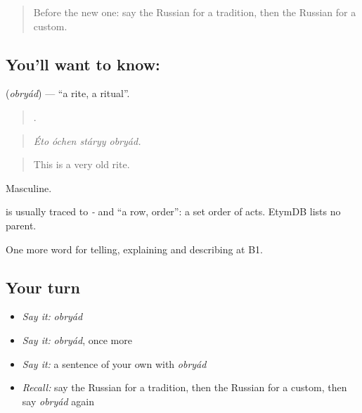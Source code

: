 \label{lesson:RU-C318-obryad}



\begin{quote}
Before the new one: say the Russian for a tradition, then the Russian for a custom.
\end{quote}

\subsection*{You'll want to know: }
\textbf{} (\emph{obryád}) — \textquotedblleft{}a rite, a ritual\textquotedblright{}.

\begin{quote}
   .
\end{quote}

\begin{quote}
\emph{Éto óchen stáryy obryád.}
\end{quote}

\begin{quote}
This is a very old rite.
\end{quote}

Masculine.

\begin{cousinweb}
\emph{} is usually traced to \emph{-} and \emph{} \textquotedblleft{}a row, order\textquotedblright{}: a set order of acts. EtymDB lists no parent.
\end{cousinweb}

\begin{grammarlens}[title={What you've built}]
One more word for telling, explaining and describing at B1.
\end{grammarlens}

\subsection*{Your turn}
\begin{itemize}
\raggedright
  \item \emph{Say it:} \emph{obryád}
  \item \emph{Say it:} \emph{obryád}, once more
  \item \emph{Say it:} a sentence of your own with \emph{obryád}
  \item \emph{Recall:} say the Russian for a tradition, then the Russian for a custom, then say \emph{obryád} again
\end{itemize}

